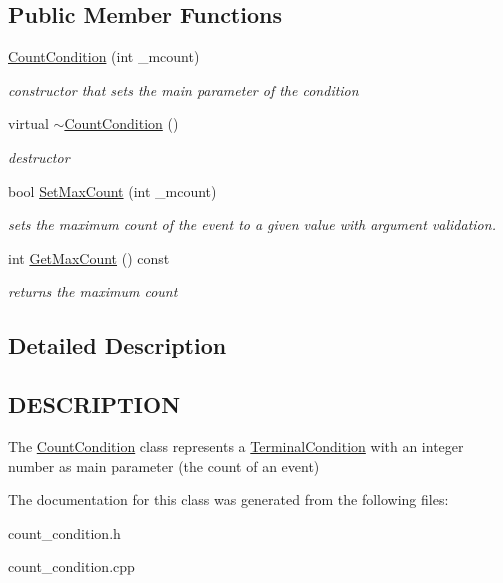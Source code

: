 \subsection*{Public Member Functions}
\begin{DoxyCompactItemize}
\item 
\mbox{\label{class_count_condition_a5de1b537356b81f9deae0092acaa1f6c}} 
\hyperlink{class_count_condition_a5de1b537356b81f9deae0092acaa1f6c}{Count\+Condition} (int \+\_\+mcount)
\begin{DoxyCompactList}\small\item\em constructor that sets the main parameter of the condition \end{DoxyCompactList}\item 
\mbox{\label{class_count_condition_a64dd5e9e032acc504a780f1110e369d3}} 
virtual \hyperlink{class_count_condition_a64dd5e9e032acc504a780f1110e369d3}{$\sim$\+Count\+Condition} ()
\begin{DoxyCompactList}\small\item\em destructor \end{DoxyCompactList}\item 
\mbox{\label{class_count_condition_a7652f4ce1530378d617b2700b984a3a6}} 
bool \hyperlink{class_count_condition_a7652f4ce1530378d617b2700b984a3a6}{Set\+Max\+Count} (int \+\_\+mcount)
\begin{DoxyCompactList}\small\item\em sets the maximum count of the event to a given value with argument validation. \end{DoxyCompactList}\item 
\mbox{\label{class_count_condition_ae7f23cc8b64ae574691fd62af2e2091d}} 
int \hyperlink{class_count_condition_ae7f23cc8b64ae574691fd62af2e2091d}{Get\+Max\+Count} () const
\begin{DoxyCompactList}\small\item\em returns the maximum count \end{DoxyCompactList}\end{DoxyCompactItemize}


\subsection{Detailed Description}
\hypertarget{function_8h_DESCRIPTION}{}\subsection{D\+E\+S\+C\+R\+I\+P\+T\+I\+ON}\label{function_8h_DESCRIPTION}
The \hyperlink{class_count_condition}{Count\+Condition} class represents a \hyperlink{class_terminal_condition}{Terminal\+Condition} with an integer number as main parameter (the count of an event) 

The documentation for this class was generated from the following files\+:\begin{DoxyCompactItemize}
\item 
count\+\_\+condition.\+h\item 
count\+\_\+condition.\+cpp\end{DoxyCompactItemize}
